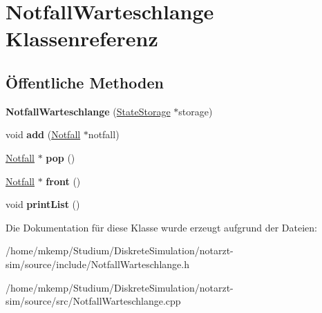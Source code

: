 \hypertarget{classNotfallWarteschlange}{}\section{Notfall\+Warteschlange Klassenreferenz}
\label{classNotfallWarteschlange}
\subsection*{Öffentliche Methoden}
\begin{DoxyCompactItemize}
\item 
{\bfseries Notfall\+Warteschlange} (\hyperlink{classStateStorage}{State\+Storage} $\ast$storage)\hypertarget{classNotfallWarteschlange_a6044cf77e4e6485aa182c03d03da7cd3}{}\label{classNotfallWarteschlange_a6044cf77e4e6485aa182c03d03da7cd3}

\item 
void {\bfseries add} (\hyperlink{classNotfall}{Notfall} $\ast$notfall)\hypertarget{classNotfallWarteschlange_adbe91265e4e4fa6b075714aaa6287fc6}{}\label{classNotfallWarteschlange_adbe91265e4e4fa6b075714aaa6287fc6}

\item 
\hyperlink{classNotfall}{Notfall} $\ast$ {\bfseries pop} ()\hypertarget{classNotfallWarteschlange_af941293bb468dccf5283bdba4d3ad664}{}\label{classNotfallWarteschlange_af941293bb468dccf5283bdba4d3ad664}

\item 
\hyperlink{classNotfall}{Notfall} $\ast$ {\bfseries front} ()\hypertarget{classNotfallWarteschlange_ab541fb2019e971af7fb45b995c9c8418}{}\label{classNotfallWarteschlange_ab541fb2019e971af7fb45b995c9c8418}

\item 
void {\bfseries print\+List} ()\hypertarget{classNotfallWarteschlange_aab9cd1910a42b4c6a563daec7f49cddd}{}\label{classNotfallWarteschlange_aab9cd1910a42b4c6a563daec7f49cddd}

\end{DoxyCompactItemize}


Die Dokumentation für diese Klasse wurde erzeugt aufgrund der Dateien\+:\begin{DoxyCompactItemize}
\item 
/home/mkemp/\+Studium/\+Diskrete\+Simulation/notarzt-\/sim/source/include/Notfall\+Warteschlange.\+h\item 
/home/mkemp/\+Studium/\+Diskrete\+Simulation/notarzt-\/sim/source/src/Notfall\+Warteschlange.\+cpp\end{DoxyCompactItemize}
